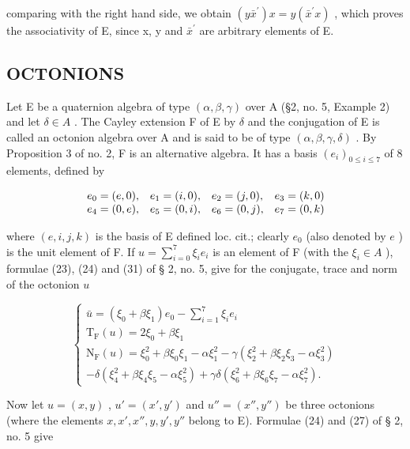 comparing with the right hand side, we obtain \((y\bar{x}^{\prime})x = y(\bar{x}^{\prime}x)\) , which proves the associativity of E, since x, y and \(\bar{x}^{\prime}\) are arbitrary elements of E.

\subsection{OCTONIONS}

Let E be a quaternion algebra of type \((\alpha, \beta, \gamma)\) over A (§2, no. 5, Example 2) and let \(\delta \in A\) . The Cayley extension F of E by \(\delta\) and the conjugation of E is called an octonion algebra over A and is said to be of type \((\alpha, \beta, \gamma, \delta)\) . By Proposition 3 of no. 2, F is an alternative algebra. It has a basis \((e_{i})_{0 \leq i \leq 7}\) of 8 elements, defined by

\[
\begin{array}{l l l l} e _ {0} = (e, 0), & e _ {1} = (i, 0), & e _ {2} = (j, 0), & e _ {3} = (k, 0) \\ e _ {4} = (0, e), & e _ {5} = (0, i), & e _ {6} = (0, j), & e _ {7} = (0, k) \end{array}
\]

where \((e, i, j, k)\) is the basis of E defined loc. cit.; clearly \(e_0\) (also denoted by \(e\) ) is the unit element of F. If \(u = \sum_{i=0}^{7} \xi_i e_i\) is an element of F (with the \(\xi_i \in A\) ), formulae (23), (24) and (31) of § 2, no. 5, give for the conjugate, trace and norm of the octonion \(u\)

\[
\left\{ \begin{array}{c} \bar {u} = (\xi_ {0} + \beta \xi_ {1}) e _ {0} - \sum_ {i = 1} ^ {7} \xi_ {i} e _ {i} \\ \mathrm{T} _ {\mathrm{F}} (u) = 2 \xi_ {0} + \beta \xi_ {1} \\ \mathrm{N} _ {\mathrm{F}} (u) = \xi_ {0} ^ {2} + \beta \xi_ {0} \xi_ {1} - \alpha \xi_ {1} ^ {2} - \gamma (\xi_ {2} ^ {2} + \beta \xi_ {2} \xi_ {3} - \alpha \xi_ {3} ^ {2}) \\ - \delta (\xi_ {4} ^ {2} + \beta \xi_ {4} \xi_ {5} - \alpha \xi_ {5} ^ {2}) + \gamma \delta (\xi_ {6} ^ {2} + \beta \xi_ {6} \xi_ {7} - \alpha \xi_ {7} ^ {2}). \end{array} \right.\tag{4}
\]

Now let \(u = (x, y)\) , \(u' = (x', y')\) and \(u'' = (x'', y'')\) be three octonions (where the elements \(x, x', x'', y, y', y''\) belong to E). Formulae (24) and (27) of § 2, no. 5 give

